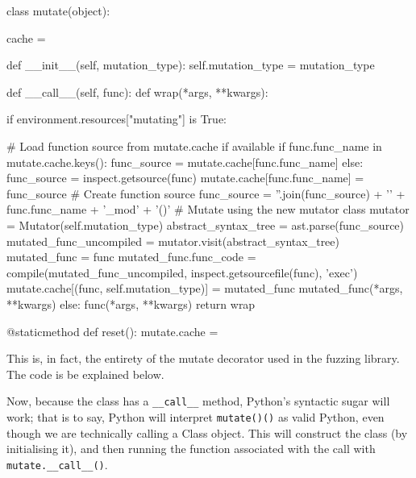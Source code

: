 \begin{pyglist}[language = python, encoding = utf8, caption={The "mutate" decorator}, listingname=\textbf{Code Sample}, listingname=\textbf{Code Sample}, numbers=left]
class mutate(object):

    cache = {}

    def __init__(self, mutation_type):
        self.mutation_type = mutation_type

    def __call__(self, func):
        def wrap(*args, **kwargs):

            if environment.resources["mutating"] is True:

                # Load function source from mutate.cache if available
                if func.func_name in mutate.cache.keys():
                    func_source = mutate.cache[func.func_name]
                else:
                    func_source = inspect.getsource(func)
                    mutate.cache[func.func_name] = func_source
                # Create function source
                func_source = ''.join(func_source) + '\n' + func.func_name + '_mod' + '()'
                # Mutate using the new mutator class
                mutator = Mutator(self.mutation_type)
                abstract_syntax_tree = ast.parse(func_source)
                mutated_func_uncompiled = mutator.visit(abstract_syntax_tree)
                mutated_func = func
                mutated_func.func_code = compile(mutated_func_uncompiled, inspect.getsourcefile(func), 'exec')
                mutate.cache[(func, self.mutation_type)] = mutated_func
                mutated_func(*args, **kwargs)
            else:
                func(*args, **kwargs)
        return wrap

    @staticmethod
    def reset():
        mutate.cache = {}
\end{pyglist} \par

This is, in fact, the entirety of the mutate decorator used in the fuzzing library. The code is be explained below. \par

Now, because the class has a \texttt{\_\_call\_\_} method, Python's syntactic sugar will work; that is to say, Python will interpret \texttt{mutate()()} as valid Python, even though we are technically calling a Class object. This will construct the class (by initialising it), and then running the function associated with the call with \texttt{mutate.\_\_call\_\_()}. \par

